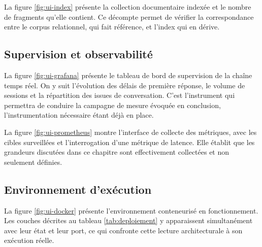 La figure \ref{fig:ui-index} présente la collection documentaire indexée et le nombre de fragments qu'elle contient. Ce décompte permet de vérifier la correspondance entre le corpus relationnel, qui fait référence, et l'index qui en dérive.


\subsection{Supervision et observabilité}

La figure \ref{fig:ui-grafana} présente le tableau de bord de supervision de la chaîne temps réel. On y suit l'évolution des délais de première réponse, le volume de sessions et la répartition des issues de conversation. C'est l'instrument qui permettra de conduire la campagne de mesure évoquée en conclusion, l'instrumentation nécessaire étant déjà en place.


La figure \ref{fig:ui-prometheus} montre l'interface de collecte des métriques, avec les cibles surveillées et l'interrogation d'une métrique de latence. Elle établit que les grandeurs discutées dans ce chapitre sont effectivement collectées et non seulement définies.


\subsection{Environnement d'exécution}

La figure \ref{fig:ui-docker} présente l'environnement conteneurisé en fonctionnement. Les couches décrites au tableau \ref{tab:deploiement} y apparaissent simultanément avec leur état et leur port, ce qui confronte cette lecture architecturale à son exécution réelle.


